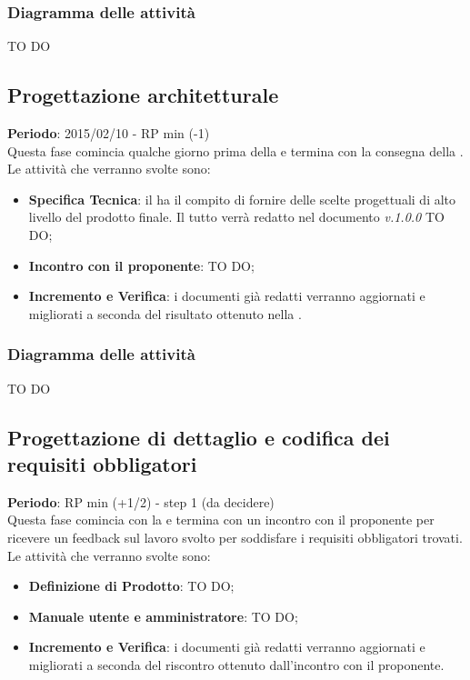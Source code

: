 		\subsubsection{Diagramma delle attività} %
		\label{ssub:diagramma_delle_attivita}
		TO DO
	
	\subsection{Progettazione architetturale} %
	\label{sub:progettazione_architetturale}
	\textbf{Periodo}:  2015/02/10 - RP min (-1) \\
	Questa fase comincia qualche giorno prima della \RR{} e termina con la consegna della \RPmin.
	Le attività che verranno svolte sono:
		\begin{itemize}
			\item \textbf{Specifica Tecnica}: il \roleDesigner{} ha il compito di fornire delle scelte progettuali di alto livello del prodotto finale. Il tutto verrà redatto nel documento \docNameST{} \emph{v.1.0.0} TO DO;
			\item \textbf{Incontro con il proponente}: TO DO;
			\item \textbf{Incremento e Verifica}: i documenti già redatti verranno aggiornati e migliorati a seconda del risultato ottenuto nella \RR.
		\end{itemize}
		
		\subsubsection{Diagramma delle attività} %
		\label{ssub:diagramma_delle_attivita}
		TO DO
	
	\subsection{Progettazione di dettaglio e codifica dei requisiti obbligatori} %
	\label{sub:progettazione_di_dettaglio_e_codifica_dei_requisiti_obbligatori}
	\textbf{Periodo}:  RP min (+1/2) - step 1 (da decidere) \\
	Questa fase comincia con la \RPmin{} e termina con un incontro con il proponente per ricevere un feedback sul lavoro svolto per soddisfare i requisiti obbligatori trovati.
	Le attività che verranno svolte sono:
		\begin{itemize}
			\item \textbf{Definizione di Prodotto}: TO DO;
			\item \textbf{Manuale utente e amministratore}: TO DO;
			\item \textbf{Incremento e Verifica}: i documenti già redatti verranno aggiornati e migliorati a seconda del riscontro ottenuto dall'incontro con il proponente.
		\end{itemize}
		
